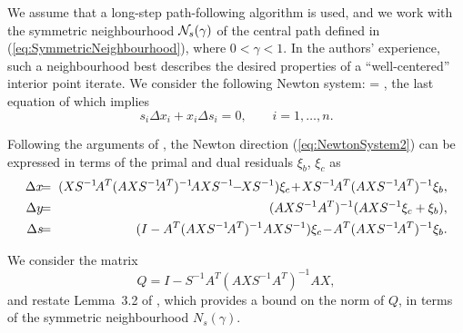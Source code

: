 We assume that a long-step path-following algorithm is used, 
and we work with the symmetric neighbourhood $\mathcal{N}_s(\gamma)$
of the central path defined in (\ref{eq:SymmetricNeighbourhood}),
%
where $0 < \gamma < 1$. 
In the authors' experience, such a neighbourhood best describes the desired 
properties of a ``well-centered'' interior point iterate.
%
We consider the following Newton system:
\be \label{eq:NewtonSystem2}
 = 
\left[ \begin{array}{c}
    \xi_b \\ \xi_c \\ 0
  \end{array} \right],
\ee
the last equation of which implies
\[
 s_i\Delta x_i + x_i\Delta s_i = 0, \qquad i = 1, \ldots, n.
\]

Following the arguments of \cite{GondzioGrothey03}, the Newton
direction (\ref{eq:NewtonSystem2}) can be expressed in terms 
of the primal and dual residuals $\xi_b$, $\xi_c$ as
%
\begin{eqnarray}  \label{eq:Directions}
  \Delta x & \hspace{-1ex} = \hspace{-1ex} & 
  (XS^{-1} \! A^T (AXS^{-1} \!\! A^T)^{-1} \! AXS^{-1} \!\!-\!\! XS^{-1} )\xi_c
  \! + \! XS^{-1} \! A^T (AXS^{-1} \! A^T)^{-1} \xi_b, \nonumber \\
  \Delta y & \hspace{-1ex} = \hspace{-1ex} & 
  (AXS^{-1} A^T)^{-1} (AXS^{-1} \xi_c + \xi_b),                  \\
  \Delta s & \hspace{-1ex} = \hspace{-1ex} & 
  (I - A^T (AXS^{-1} \! A^T)^{-1} AXS^{-1} )\xi_c 
  \! - \! A^T (AXS^{-1} \! A^T)^{-1} \xi_b.            \nonumber
\end{eqnarray}

We consider the matrix
\[
  Q = I - S^{-1} A^T (A X S^{-1} A^T)^{-1} A X,
\]
and restate Lemma~3.2 of \cite{GondzioGrothey03},
which provides a bound on the norm of $Q$, in terms of
the symmetric neighbourhood $N_s(\gamma)$.

